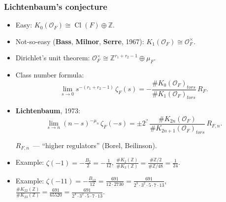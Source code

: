 \documentclass[handout]{beamer}
\newcommand{\personality}[1]{{\bf #1}}
\newcommand{\ZZ}{\mathbb{Z}}
\newcommand{\isom}{\cong}
\DeclareMathOperator{\Cl}{Cl}
\renewcommand{\O}{\mathcal{O}}
\begin{document}
\begin{frame}
  \frametitle{Lichtenbaum's conjecture}

  \begin{itemize}
  \item<2-> Easy: $K_0 (\O_F) \isom \Cl (F) \oplus \ZZ$.

  \item<3-> Not-so-easy (\personality{Bass}, \personality{Milnor},
    \personality{Serre}, 1967): $K_1 (\O_F) \isom \O_F^\times$.

  \item<4-> Dirichlet's unit theorem:
    $\O_F^\times \isom \ZZ^{r_1+r_2-1} \oplus \mu_F$.

  \item<5-> Class number formula:
    $$\lim_{s\to 0} s^{-(r_1 + r_2 - 1)}\,\zeta_F (s) = -\frac{\#K_0 (\O_F)_{tors}}{\#K_1 (\O_F)_{tors}}\,R_F.$$

  \item<6-> \personality{Lichtenbaum}, 1973:
    $$\lim_{s\to n} (n-s)^{-\mu_n}\,\zeta_F (-s) = \pm 2^{?}\,\frac{\#K_{2n} (\O_F)}{\#K_{2n+1} (\O_F)_{tors}}\,R_{F,n}.$$

    $R_{F,n}$~--- ``higher regulators'' (Borel, Beilinson).

  \item<7-> Example: $\zeta (-1) = -\frac{B_2}{2} = -\frac{1}{12}$,
    $\frac{\# K_2 (\ZZ)}{\# K_3 (\ZZ)} = \frac{\# \ZZ/2}{\# \ZZ/48} = \frac{1}{24}$.

  \item<8-> Example:
    $\zeta (-11) = -\frac{B_{12}}{12} = \frac{691}{12\cdot 2730} = \frac{691}{2^3\cdot 3^2\cdot 5\cdot 7\cdot 13}$,
    $\frac{\# K_{22} (\ZZ)}{\# K_{23} (\ZZ)} = \frac{691}{65520} = \frac{691}{2^4\cdot 3^2\cdot 5\cdot 7\cdot 13}$.
  \end{itemize}
\end{frame}

\end{document}
